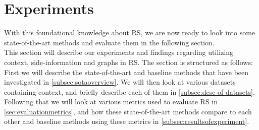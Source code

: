 \section{Experiments}\label{sec:experiments}
With this foundational knowledge about RS, we are now ready to look into some state-of-the-art methods and evaluate them in the following section.\\ 
This section will describe our experiments and findings regarding utilizing context, side-information and graphs in RS.
The section is structured as follows: First we will describe the state-of-the-art and baseline methods that have been investigated in \autoref{subsec:sotaoverview}.
We will then look at various datasets containing context, and briefly describe each of them in \autoref{subsec:desc-of-datasets}.
Following that we will look at various metrics used to evaluate RS in \autoref{sec:evaluationmetrics}, and how these state-of-the-art methods compare to each other and baseline methods using these metrics in \autoref{subsec:resultsofexperiment}.





